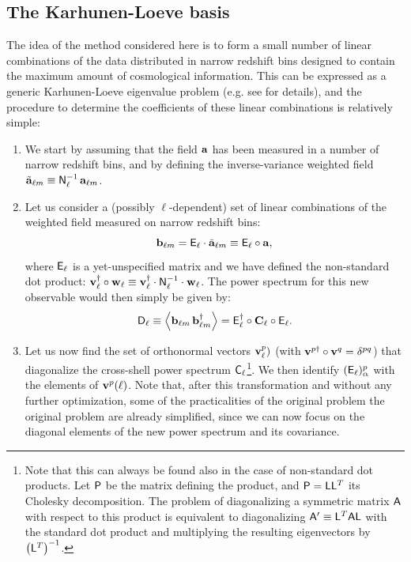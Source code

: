 \documentclass[twocolumn,amsfont,amssymb,amsmath, showpacs,balancelastpage, nofootinbib]{revtex4-1}
\begin{document}
  \subsection{The Karhunen-Loeve basis}\label{ssec:method.klbasis}
    The idea of the method considered here is to form a small number of linear combinations of the data distributed in narrow redshift bins designed to contain the maximum amount of cosmological information. This can be expressed as a generic Karhunen-Loeve eigenvalue problem (e.g. see \cite{1997ApJ...480...22T} for details), and the procedure to determine the coefficients of these linear combinations is relatively simple:
    \begin{enumerate}
      \item We start by assuming that the field ${\bf a}$ has been measured in a number of narrow redshift bins, and by defining the inverse-variance weighted field $\tilde{\bf a}_{\ell m}\equiv{\sf N}^{-1}_\ell\,{\bf a}_{\ell m}$.
      \item Let us consider a (possibly $\ell$-dependent) set of linear combinations of the weighted field measured on narrow redshift bins:
      \begin{equation}
        {\bf b}_{\ell m}={\sf E}_\ell\cdot\tilde{\bf a}_{\ell m}\equiv{\sf E}_\ell\circ{\bf a},
      \end{equation}
      where ${\sf E}_\ell$ is a yet-unspecified matrix and we have defined the non-standard dot product: ${\bf v}^\dag_\ell\circ{\bf w}_\ell\equiv{\bf v}^\dag_\ell\cdot{\sf N}^{-1}_\ell\cdot{\bf w}_\ell$. The power spectrum for this new observable would then simply be given by:
      \begin{equation}\label{eq:dp_uncouple}
        {\sf D}_\ell\equiv\left\langle{\bf b}_{\ell m}\,{\bf b}^\dag_{\ell m}\right\rangle={\sf E}_\ell^\dag\circ{\bf C}_\ell\circ{\sf E}_\ell.
      \end{equation}
      \item Let us now find the set of orthonormal vectors ${\bf v}^p_\ell)$ (with ${\bf v}^{p\dag}\circ{\bf v}^q=\delta^{pq}$) that diagonalize the cross-shell power spectrum ${\sf C}_\ell$\footnote{Note that this can always be found also in the case of non-standard dot products. Let ${\sf P}$ be the matrix defining the product, and ${\sf P}={\sf L}{\sf L}^T$ its Cholesky decomposition. The problem of diagonalizing a symmetric matrix ${\sf A}$ with respect to this product is equivalent to diagonalizing ${\sf A}'\equiv{\sf L}^T{\sf A}{\sf L}$ with the standard dot product and multiplying the resulting eigenvectors by $\left({\sf L}^T\right)^{-1}$.}. We then identify $({\sf E}_\ell)^p_\alpha$ with the elements of ${\bf v}^p(\ell)$. Note that, after this transformation and without any further optimization, some of the practicalities of the original problem the original problem are already simplified, since we can now focus on the diagonal elements of the new power spectrum and its covariance.

\end{enumerate}
\end{document}

